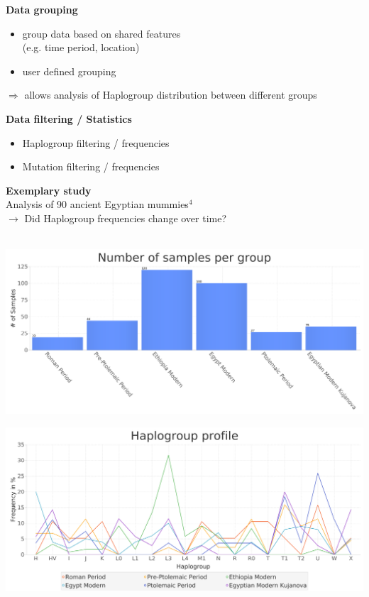 \documentclass[a0paper,portrait]{baposter}
\begin{document}
\begin{poster}
{	\begin{minipage}[t]{0.5\textwidth}
		\textbf{Data grouping}
		\begin{itemize}[leftmargin=*]
			\item group data based on shared features \\
			(e.g. time period, location)
			\item user defined grouping
		\end{itemize}
		\begin{center}$\Rightarrow$ allows analysis of Haplogroup distribution between different groups\end{center}
	\end{minipage}
	\hspace{0.5em}
	\begin{minipage}[t]{0.5\textwidth}
		\textbf{Data filtering / Statistics}
		\begin{itemize}[leftmargin=*]
			\item Haplogroup filtering / frequencies
			\item Mutation filtering / frequencies
		\end{itemize}
	\end{minipage}

	\vspace{1em}

\textbf{Exemplary study}\\
Analysis of 90 ancient Egyptian mummies$^4$\\
$\rightarrow$ Did Haplogroup frequencies change over time?\\
\\
	\begin{minipage}{0.5\textwidth}
		\includegraphics[width=\textwidth]{figures/group_sizes2.png}
	\end{minipage}
	\begin{minipage}{0.5\textwidth}
			\includegraphics[width=\textwidth]{figures/profile.png}
	\end{minipage}

}
\end{poster}
\end{document}
